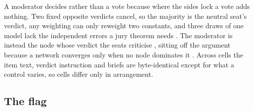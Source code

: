 A moderator decides rather than a vote because where the sides lock a
vote adds nothing. Two fixed opposite verdicts cancel, so the majority is
the neutral seat's verdict, any weighting
\citep{shapley1984optimizing} can only reweight two constants, and three
draws of one model lack the independent errors a jury theorem needs
\citep{ladha1992condorcet}. %
The moderator is instead the node whose verdict the seats criticise
\citep{mercier2011argumentative,longino1990science}, sitting off the
argument because a network converges only when no node dominates it
\citep{golub2010naive}. %
Across cells the item text, verdict instruction and briefs are
byte-identical except for what a control varies, so cells differ only in
arrangement. %

\subsection{The flag}
\label{sec-method-flag}

